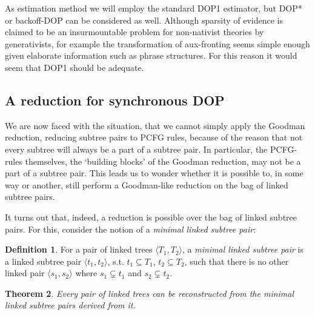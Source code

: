 \documentclass[a4paper]{article}
\newtheorem{theorem}{Theorem}[section]
\theoremstyle{definition}
\newtheorem{definition}[theorem]{Definition}
\begin{document}
As estimation method we will employ the standard DOP1 estimator, but DOP* or
backoff-DOP can be considered as well. Although sparsity of evidence is
claimed to be an insurmountable problem for non-nativist theories by
generativists, for example the transformation of aux-fronting seems simple
enough given elaborate information such as phrase structures. For this reason
it would seem that DOP1 should be adequate.

\subsection{A reduction for synchronous DOP}

We are now faced with the situation, that we cannot simply apply the Goodman
reduction, reducing subtree pairs to PCFG rules, because of the reason that not
every subtree will always be a part of a subtree pair. In particular, the
PCFG-rules themselves, the `building blocks' of the Goodman reduction, may not
be a part of a subtree pair. This leads us to wonder whether it is possible to,
in some way or another, still perform a Goodman-like reduction on the bag of
linked subtree pairs.

It turns out that, indeed, a reduction is possible over the bag of linked
subtree pairs. For this, consider the notion of a \emph{minimal linked subtree
pair}:

\begin{definition}
For a pair of linked trees $\langle T_1, T_2 \rangle$, a \emph{minimal linked
subtree pair} is a linked subtree pair $\langle t_1, t_2 \rangle$, s.t. $t_1
\subseteq T_1$, $t_2 \subseteq T_2$, such that there is no other linked pair
$\langle s_1, s_2 \rangle$ where $s_1 \subsetneq t_1$ and $s_2 \subsetneq t_2$.
\end{definition}

\begin{theorem}
Every pair of linked trees can be reconstructed from the minimal linked subtree
pairs derived from it.
\end{theorem}
\end{document}
